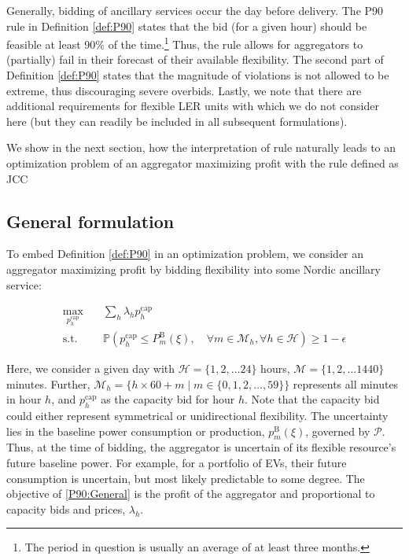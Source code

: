 \documentclass[conference]{IEEEtran}
\begin{document}
Generally, bidding of ancillary services occur the day before delivery. The P90 rule in Definition \ref{def:P90} states that the bid (for a given hour) should be feasible at least 90\% of the time.\footnote{The period in question is usually an average of at least three months.} Thus, the rule allows for aggregators to (partially) fail in their forecast of their available flexibility. The second part of Definition \ref{def:P90} states that the magnitude of violations is not allowed to be extreme, thus discouraging severe overbids. Lastly, we note that there are additional requirements for flexible \ac{LER} units \cite{energinet} with which we do not consider here (but they can readily be included in all subsequent formulations).

We show in the next section, how the interpretation of rule naturally leads to an optimization problem of an aggregator maximizing profit with the rule defined as \ac{JCC}


\subsection{General formulation}

To embed Definition \ref{def:P90} in an optimization problem, we consider an aggregator maximizing profit by bidding flexibility into some Nordic ancillary service:

\begin{align}\label{P90:General}
    \max_{p_{h}^{\text{cap}}} \quad & \sum_h \lambda_h p_{h}^{\text{cap}}                                                                                                                                               \\
    \text{s.t.} \quad               & \mathbb{P}  \left( p_{h}^{\text{cap}} \leq P_{m}^{\text{B}}(\xi), \quad \forall{m} \in \mathcal{M}_{h},  \forall{h} \in \mathcal{H}  \right) \geq 1 - \epsilon \label{P90:General:jcc}
\end{align}

Here, we consider a given day with $\mathcal{H} = \{1, 2,  \ldots 24\}$ hours, $\mathcal{M} = \{1, 2,  \ldots 1440\}$ minutes. Further, $ \mathcal{M}_{h} = \{h \times 60 + m \mid m \in \{0, 1, 2, \ldots, 59\}\}$ represents all minutes in hour $h$, and $p_{h}^{\text{cap}}$ as the capacity bid for hour $h$. Note that the capacity bid could either represent symmetrical or unidirectional flexibility. The uncertainty lies in the baseline power consumption or production, $p_{m}^{\text{B}}(\xi)$, governed by $\mathcal{P}$. Thus, at the time of bidding, the aggregator is uncertain of its flexible resource's future baseline power. For example, for a portfolio of \acp{EV}, their future consumption is uncertain, but most likely predictable to some degree. The objective of \eqref{P90:General} is the profit of the aggregator and proportional to capacity bids and prices, $\lambda_h$.
\end{document}
